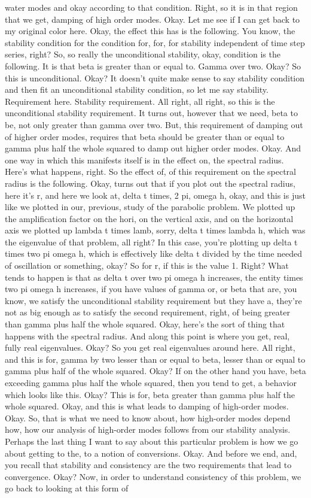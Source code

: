 \documentclass[10pt]{article}
\begin{document}
water modes and okay according to that condition. Right, so it is in that region that we get, damping of high order modes. Okay. Let me see if I can get back to my original color here. Okay, the effect this has is the following. You know, the stability condition for the condition for, for, for stability independent of time step series, right? So, so really the unconditional stability, okay, condition is the following. It is that beta is greater than or equal to. Gamma over two. Okay? So this is unconditional. Okay? It doesn't quite make sense to say stability condition and then fit an unconditional stability condition, so let me say stability. Requirement here. Stability requirement. All right, all right, so this is the unconditional stability requirement. It turns out, however that we need, beta to be, not only greater than gamma over two. But, this requirement of damping out of higher order modes, requires that beta should be greater than or equal to gamma plus half the whole squared to damp out higher order modes. Okay. And one way in which this manifests itself is in the effect on, the spectral radius. Here's what happens, right. So the effect of, of this requirement on the spectral radius is the following. Okay, turns out that if you plot out the spectral radius, here it's r, and here we look at, delta t times, 2 pi, omega h, okay, and this is just like we plotted in our, previous, study of the parabolic problem. We plotted up the amplification factor on the hori, on the vertical axis, and on the horizontal axis we plotted up lambda t times lamb, sorry, delta t times lambda h, which was the eigenvalue of that problem, all right? In this case, you're plotting up delta t times two pi omega h, which is effectively like delta t divided by the time needed of oscillation or something, okay? So for r, if this is the value 1.  Right? What tends to happen is that as delta t over two pi omega h increases, the entity times two pi omega h increases, if you have values of gamma or, or beta that are, you know, we satisfy the unconditional stability requirement but they have a, they're not as big enough as to satisfy the second requirement, right, of being greater than gamma plus half the whole squared. Okay, here's the sort of thing that happens with the spectral radius. And along this point is where you get, real, fully real eigenvalues. Okay? So you get real eigenvalues around here. All right, and this is for, gamma by two lesser than or equal to beta, lesser than or equal to gamma plus half of the whole squared. Okay? If on the other hand you have, beta exceeding gamma plus half the whole squared, then you tend to get, a behavior which looks like this. Okay? This is for, beta greater than gamma plus half the whole squared. Okay, and this is what leads to damping of high-order modes. Okay. So, that is what we need to know about, how high-order modes depend how, how our analysis of high-order modes follows from our stability analysis. Perhaps the last thing I want to say about this particular problem is how we go about getting to the, to a notion of conversions. Okay. And before we end, and, you recall that stability and consistency are the two requirements that lead to convergence. Okay? Now, in order to understand consistency of this problem, we go back to looking at this form of 
\end{document}
